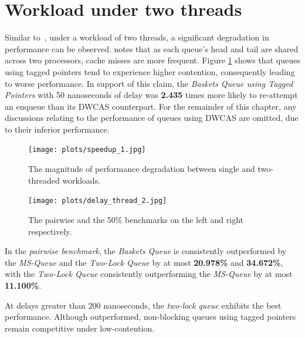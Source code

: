 \section{Workload under two threads}
Similar to~\citep{michael1996simple,hoffman2007baskets,ladan2008optimistic},
under a workload of two threads, a significant degradation in performance can
be observed. \citeauthor{michael1996simple} notes that as each queue's head and
tail are shared across two processors, cache misses are more frequent. 
Figure \ref{fig:perf_deg_1_thread} shows that queues using tagged pointers tend
to experience higher contention, consequently leading to worse performance. 
In support of this claim, the \emph{Baskets Queue using Tagged Pointers} with
50 nanoseconds of delay was \textbf{2.435} times more likely to re-attempt an
enqueue than its DWCAS counterpart. For the remainder of this chapter, any
discussions relating to the performance of queues
using DWCAS are omitted, due to their inferior performance.

\begin{figure}[!ht]
    \centering
    \texttt{[image: plots/speedup\_1.jpg]}
    \caption{The magnitude of performance degradation between single and two-threaded workloads.}
    \label{fig:perf_deg_1_thread}
\end{figure}

\begin{figure}[!ht]
    \centering
    \texttt{[image: plots/delay\_thread\_2.jpg]}
    \caption{The pairwise and the 50\% benchmarks on the left and right respectively.}
    \label{fig:perf_2_thread}
\end{figure}

In the \emph{pairwise benchmark}, the \emph{Baskets Queue} is consistently
outperformed by the \emph{MS-Queue} and the \emph{Two-Lock Queue} by at most
\textbf{20.978\%} and \textbf{34.672\%}, with the \emph{Two-Lock Queue}
consistently outperforming the \emph{MS-Queue} by at most \textbf{11.100\%}.

At delays greater than 200 nanoseconds, the \emph{two-lock queue} exhibits the
best performance.
Although outperformed, non-blocking queues using tagged pointers remain
competitive under low-contention. 

